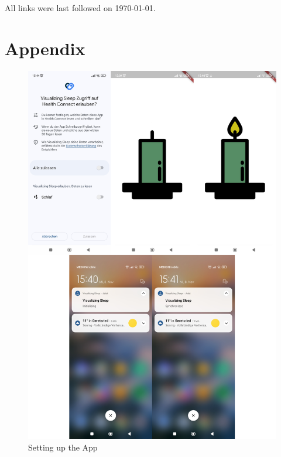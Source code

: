 \documentclass[
  a4paper,  %
  twoside,  %
  bibliography=totoc,
  headsepline,
  cleardoublepage=empty,
  parskip=half,
  draft=false
]{scrbook}
\begin{document}
\printbibliography

All links were last followed on \today.

\appendix

\chapter{Appendix}
\label{appendix:appendix_A}
\begin{figure}[H]
    \centering
    \includegraphics[scale=0.50]{graphics/SetupVis.png}
    \caption{Setting up the App}
    \label{fig:App-Setup}
\end{figure}
\end{document}
